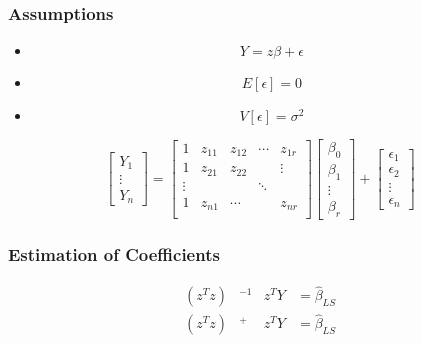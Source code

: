 \documentclass[aspectratio=169,10pt,t]{beamer}
\begin{document}
\begin{frame}[t]
	\frametitle{Assumptions}

	\begin{itemize}
		\item 
			\[
			Y = z \beta + \epsilon
			\] 
		\item 
			\[
				E  \left[ \epsilon  \right] = 0
			\] 
		\item 
			\[
				V  \left[ \epsilon  \right] = \sigma^{2}
			\] 
	\end{itemize}

	\[
		\begin{bmatrix}
			Y_1\\
			\vdots\\
			Y_{n}
		\end{bmatrix}
		=
		\begin{bmatrix}
			1 & z_{11} & z_{12} & \cdots & z_{1r}\\
			1 & z_{21} & z_{22} &  & \vdots\\
			\vdots & & & \ddots & \\
			1 & z_{n1} &   \cdots && z_{nr}\\
		\end{bmatrix}
		\begin{bmatrix}
			\beta_0\\
			\beta_1\\
			\vdots\\
			\beta_r
		\end{bmatrix}
		+
		\begin{bmatrix}
			\epsilon_1\\
			\epsilon_2\\
			\vdots\\
			\epsilon_n
		\end{bmatrix}
	\] 

\end{frame}

\begin{frame}[t]
	\frametitle{Estimation of Coefficients}
	\[
		\begin{aligned}
			\left( z^{T} z  \right)& ^{-1} &z^{T} Y &= \hat{\beta}_{LS}\\
			\left( z^{T} z  \right)& ^{+} &z^{T} Y &= \hat{\beta}_{LS}
		\end{aligned}
	\] 
\end{frame}
\end{document}
